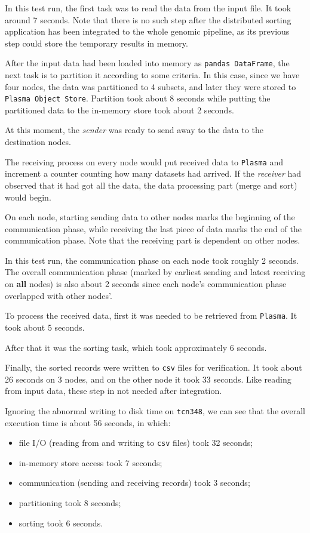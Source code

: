 \documentclass{article}
\begin{document}
In this test run, the first task was to read the data from the input file.
It took around 7 seconds.
Note that there is no such step after the distributed sorting application has been integrated to the whole genomic pipeline,
as its previous step could store the temporary results in memory.

After the input data had been loaded into memory as \texttt{pandas DataFrame}, the next task is to partition it according to some criteria.
In this case, since we have four nodes, the data was partitioned to 4 subsets, and later they were stored to \texttt{Plasma Object Store}.
Partition took about 8 seconds while putting the partitioned data to the in-memory store took about 2 seconds.

At this moment, the \textit{sender} was ready to send away to the data to the destination nodes.

The receiving process on every node would put received data to \texttt{Plasma} and increment a counter counting how many datasets had arrived.
If the \textit{receiver} had observed that it had got all the data, the data processing part (merge and sort) would begin.

On each node, starting sending data to other nodes marks the beginning of the communication phase, while receiving the last piece of data marks the end of the communication phase.
Note that the receiving part is dependent on other nodes.

In this test run, the communication phase on each node took roughly 2 seconds.
The overall communication phase (marked by earliest sending and latest receiving on \textbf{all} nodes) is also about 2 seconds since each node's communication phase overlapped with other nodes'.

To process the received data, first it was needed to be retrieved from \texttt{Plasma}.
It took about 5 seconds.

After that it was the sorting task, which took approximately 6 seconds.

Finally, the sorted records were written to \texttt{csv} files for verification.
It took about 26 seconds on 3 nodes, and on the other node it took 33 seconds.
Like reading from input data, these step in not needed after integration.

Ignoring the abnormal writing to disk time on \texttt{tcn348}, we can see that the overall execution time is about 56 seconds, in which:
\begin{itemize}
    \item file I/O (reading from and writing to \texttt{csv} files) took 32 seconds;
    \item in-memory store access took 7 seconds;
    \item communication (sending and receiving records) took 3 seconds;
    \item partitioning took 8 seconds;
    \item sorting took 6 seconds.
\end{itemize}
\end{document}
